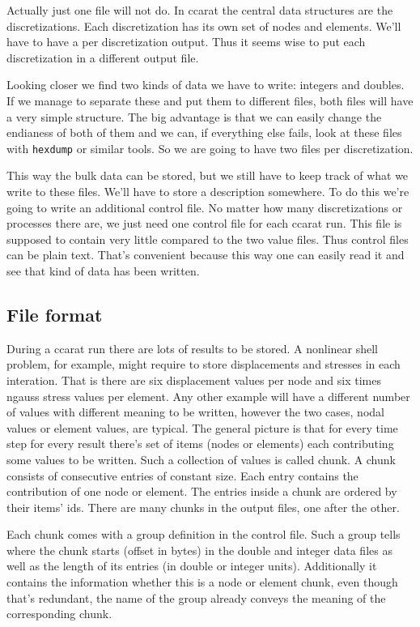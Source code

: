 Actually just one file will not do. In ccarat the central data structures
are the discretizations. Each discretization has its own set of nodes
and elements. We'll have to have a per discretization output. Thus
it seems wise to put each discretization in a different output file.

Looking closer we find two kinds of data we have to write: integers
and doubles. If we manage to separate these and put them to different
files, both files will have a very simple structure. The big advantage
is that we can easily change the endianess of both of them and we
can, if everything else fails, look at these files with \texttt{hexdump}
or similar tools. So we are going to have two files per discretization.

This way the bulk data can be stored, but we still have to keep track
of what we write to these files. We'll have to store a description
somewhere. To do this we're going to write an additional control file.
No matter how many discretizations or processes there are, we just
need one control file for each ccarat run. This file is supposed to
contain very little compared to the two value files. Thus control
files can be plain text. That's convenient because this way one can
easily read it and see that kind of data has been written.


\subsection{File format}

During a ccarat run there are lots of results to be stored. A nonlinear
shell problem, for example, might require to store displacements and
stresses in each interation. That is there are six displacement values
per node and six times ngauss stress values per element. Any other
example will have a different number of values with different meaning
to be written, however the two cases, nodal values or element values,
are typical. The general picture is that for every time step for every
result there's set of items (nodes or elements) each contributing
some values to be written. Such a collection of values is called chunk.
A chunk consists of consecutive entries of constant size. Each entry
contains the contribution of one node or element. The entries inside
a chunk are ordered by their items' ids. There are many chunks in
the output files, one after the other.

Each chunk comes with a group definition in the control file. Such
a group tells where the chunk starts (offset in bytes) in the double
and integer data files as well as the length of its entries (in double
or integer units). Additionally it contains the information whether
this is a node or element chunk, even though that's redundant, the
name of the group already conveys the meaning of the corresponding
chunk.

